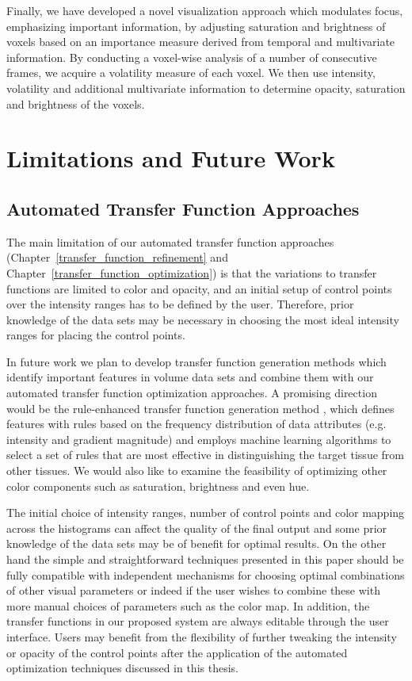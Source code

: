 Finally, we have developed a novel visualization approach which modulates focus, emphasizing important information, by adjusting saturation and brightness of voxels based on an importance measure derived from temporal and multivariate information.
By conducting a voxel-wise analysis of a number of consecutive frames, we acquire a volatility measure of each voxel. We then use intensity, volatility and additional multivariate information to determine opacity, saturation and brightness of the voxels.

\section{Limitations and Future Work}
\subsection{Automated Transfer Function Approaches}
The main limitation of our automated transfer function approaches (Chapter~\ref{transfer_function_refinement} and Chapter~\ref{transfer_function_optimization}) is that the variations to transfer functions are limited to color and opacity, and an initial setup of control points over the intensity ranges has to be defined by the user. Therefore, prior knowledge of the data sets may be necessary in choosing the most ideal intensity ranges for placing the control points.

In future work we plan to develop transfer function generation methods which identify important features in volume data sets and combine them with our automated transfer function optimization approaches. A promising direction would be the rule-enhanced transfer function generation method \cite{cai_rule-enhanced_2015}, which defines features with rules based on the frequency distribution of data attributes (e.g. intensity and gradient magnitude) and employs machine learning algorithms to select a set of rules that are most effective in distinguishing the target tissue from other tissues.
We would also like to examine the feasibility of optimizing other color components such as saturation, brightness and even hue. 

The initial choice of intensity ranges, number of control points and color mapping across the histograms can affect the quality of the final output and some prior knowledge of the data sets may be of benefit for optimal results. On the other hand the simple and straightforward techniques presented in this paper should be fully compatible with independent mechanisms for choosing optimal combinations of other visual parameters or indeed if the user wishes to combine these with more manual choices of parameters such as the color map.
In addition, the transfer functions in our proposed system are always editable through the user interface. Users may benefit from the flexibility of further tweaking the intensity or opacity of the control points after the application of the automated optimization techniques discussed in this thesis.

